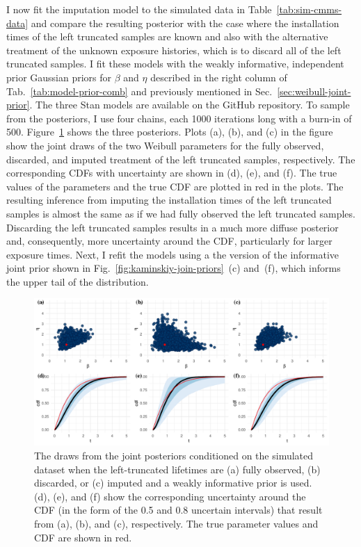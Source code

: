 I now fit the imputation model to the simulated data in Table~\ref{tab:sim-cmms-data} and compare the resulting posterior with the case where the installation times of the left truncated samples are known and also with the alternative treatment of the unknown exposure histories, which is to discard all of the left truncated samples. I fit these models with the weakly informative, independent prior Gaussian priors for $\beta$ and $\eta$ described in the right column of Tab.~\ref{tab:model-prior-comb} and previously mentioned in Sec.~\ref{sec:weibull-joint-prior}. The three Stan models are available on the GitHub repository. To sample from the posteriors, I use four chains, each 1000 iterations long with a burn-in of 500. Figure~\ref{fig:joint-post-weibull} shows the three posteriors. Plots (a), (b), and (c) in the figure show the joint draws of the two Weibull parameters for the fully observed, discarded, and imputed treatment of the left truncated samples, respectively. The corresponding CDFs with uncertainty are shown in (d), (e), and (f). The true values of the parameters and the true CDF are plotted in red in the plots. The resulting inference from imputing the installation times of the left truncated samples is almost the same as if we had fully observed the left truncated samples. Discarding the left truncated samples results in a much more diffuse posterior and, consequently, more uncertainty around the CDF, particularly for larger exposure times. Next, I refit the models using a the version of the informative joint prior shown in Fig.~\ref{fig:kaminskiy-join-priors}~(c) and~(f), which informs the upper tail of the distribution.

\begin{figure}
    \centering
    \includegraphics[width=1\textwidth]{./figures/ch-2/joint-posts.pdf}
    \caption{The draws from the joint posteriors conditioned on the simulated dataset when the left-truncated lifetimes are (a) fully observed, (b) discarded, or (c) imputed and a weakly informative prior is used. (d), (e), and (f) show the corresponding uncertainty around the CDF (in the form of the 0.5 and 0.8 uncertain intervals) that result from (a), (b), and (c), respectively. The true parameter values and CDF are shown in red.}
    \label{fig:joint-post-weibull}
\end{figure}

